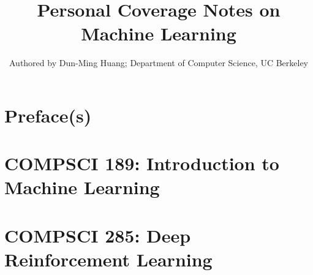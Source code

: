 \documentclass[openany]{book}
\title{Personal Coverage Notes on Machine Learning}
\author{Authored by Dun-Ming Huang; Department of Computer Science, UC Berkeley}
\begin{document}
\maketitle
\setcounter{tocdepth}{1}
\part*{Preface(s)}

\tableofcontents
\part{COMPSCI 189: Introduction to Machine Learning}

\newpage

\newpage

\newpage

\newpage

\newpage

\newpage

\newpage

\newpage

\newpage

\newpage

\newpage

\newpage

\newpage

\newpage

\newpage

\newpage

\newpage

\newpage

\newpage

\newpage

\newpage

\newpage

\newpage


\part{COMPSCI 285: Deep Reinforcement Learning}

\newpage

\newpage

\newpage

\newpage

\newpage

\newpage

\newpage

\newpage

\newpage

\newpage

\newpage

\newpage

\newpage

\newpage

\newpage

\newpage

\newpage

\newpage

\newpage

\newpage

\newpage

\newpage

\end{document}

